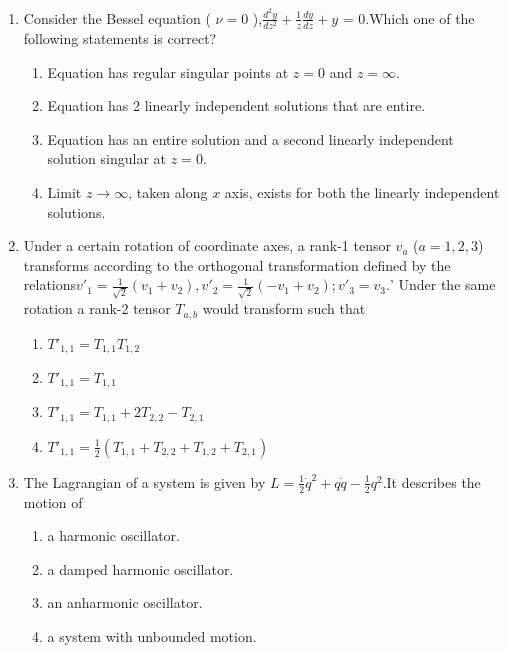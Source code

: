 \documentclass[journal,12pt,onecolumn]{IEEEtran}
\theoremstyle{remark}
\begin{document}
\begin{enumerate}
\hfill{}
\begin{multicols}{4}
    \begin{enumerate}
        \item 0
        \item $2\pi i$
        \item $-2\pi i$
        \item $(-1 + 2i)\pi$
    \end{enumerate}
\end{multicols}
\item Consider the Bessel equation ( $\nu = 0$ ),$\frac{d^2 y}{dz^2} + \frac{1}{z}\frac{dy}{dz} + y$ = 0.Which one of the following statements is correct?
\hfill{}
    \begin{enumerate}
        \item Equation has regular singular points at $z=0$ and $z=\infty$.
        \item Equation has 2 linearly independent solutions that are entire.
        \item Equation has an entire solution and a second linearly independent solution singular at $z=0$.
        \item Limit $z\to\infty$, taken along $x$ axis, exists for both the linearly independent solutions.
    \end{enumerate}


\item Under a certain rotation of coordinate axes, a rank-1 tensor $v_a$ ($a=1,2,3$) transforms according to the orthogonal transformation defined by the relations$ v'_1 = \frac{1}{\sqrt{2}}(v_1 + v_2), v'_2 =\frac{1}{\sqrt{2}}(-v_1 + v_2) ;v'_3 = v_3.$'
Under the same rotation a rank-2 tensor $T_{a,b}$ would transform such that
\hfill{}
\begin{multicols}{2}
    \begin{enumerate}
        \item $T'_{1,1} = T_{1,1}  T_{1,2}$
        \item $T'_{1,1} = T_{1,1}$
        \item $T'_{1,1} = T_{1,1} + 2T_{2,2} - T_{2,1}$
        \item $T'_{1,1} = \tfrac{1}{2}(T_{1,1} + T_{2,2} + T_{1,2} + T_{2,1})$
    \end{enumerate}
\end{multicols}

\item The Lagrangian of a system is given by $  L = \tfrac{1}{2}\dot q^{2} + q\dot q - \tfrac{1}{2} q^{2} $.It describes the motion of
\hfill{}
\begin{multicols}{2}
    \begin{enumerate}
        \item a harmonic oscillator.
        \item a damped harmonic oscillator.
        \item an anharmonic oscillator.
        \item a system with unbounded motion.
    \end{enumerate}
\end{multicols}


\end{enumerate}
\end{document}
